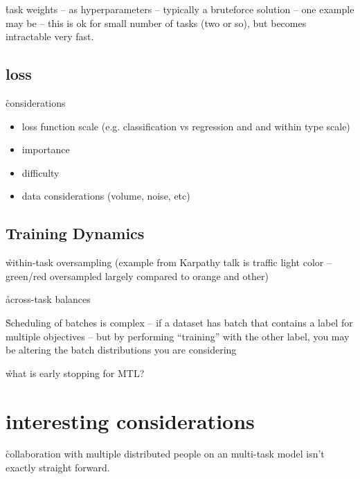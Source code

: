 \r{task weights -- as hyperparameters -- typically a bruteforce solution -- one example may be \cite{kirillov2019panoptic} -- this is ok for small number of tasks (two or so), but becomes intractable very fast.}

\subsection{loss}

\r{considerations}
\begin{itemize}[noitemsep,topsep=0pt]
	\item loss function scale (e.g. classification vs regression and and within type scale)
	\item importance
	\item difficulty
	\item data considerations (volume, noise, etc)
\end{itemize}

\subsection{Training Dynamics}

\r{within-task oversampling (example from Karpathy talk is traffic light color -- green/red oversampled largely compared to orange and other)} 

\r{across-task balances}

\r{Scheduling of batches is complex -- if a dataset has batch that contains a label for multiple objectives -- but by performing ``training'' with the other label, you may be altering the batch distributions you are considering}

\r{what is early stopping for MTL?}

\section{interesting considerations}

\r{collaboration with multiple distributed people on an multi-task model isn't exactly straight forward.}